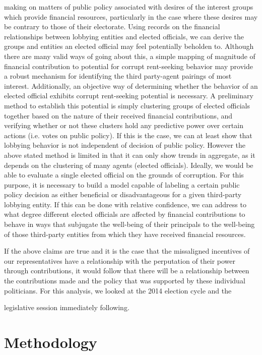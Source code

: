 \documentclass[journal]{IEEEtran}
\begin{document}
making on matters of public policy associated with desires of the interest groups which provide financial resources, particularly
in the case where these desires may be contrary to those of their electorate. Using records on the financial relationships between 
lobbying entities and elected officials, we can derive the groups and entities an elected official may feel potentially beholden 
to. Although there are many valid ways of going about this, a simple mapping of magnitude of financial contribution to potential for 
corrupt rent-seeking behavior may provide a robust mechanism for identifying the third party-agent pairings of most interest. 
Additionally, an objective way of determining whether the behavior of an elected official exhibits corrupt rent-seeking potential 
is necessary. A preliminary method to establish this potential is simply clustering groups of elected officials together based 
on the nature of their received financial contributions, and verifying whether or not these clusters hold any predictive power 
over certain actions (i.e. votes on public policy). If this is the case, we can at least show that lobbying behavior is not 
independent of decision of public policy. However the above stated method is limited in that it can only show trends in aggregate, 
as it depends on the clustering of many agents (elected officials). Ideally, we would be able to evaluate a single elected official 
on the grounds of corruption. For this purpose, it is necessary to build a model capable of labeling a certain public policy 
decision as either beneficial or disadvantageous for a given third-party lobbying entity. If this can be done with relative 
confidence, we can address to what degree different elected officials are affected by financial contributions to behave in ways 
that subjugate the well-being of their principals to the well-being of those third-party entities from which they have received 
financial resources.\newline

  If the above claims are true and it is the case that the missaligned incentives of our representatives have a relationship with the 
perputation of their power through contributions, it would follow that there will be a relationship between the contributions made
and the policy that was supported by these individual politicians. For this analysis, we looked at the 2014 election cycle and the 

legislative session immediately following.
\section{Methodology}
\end{document}
